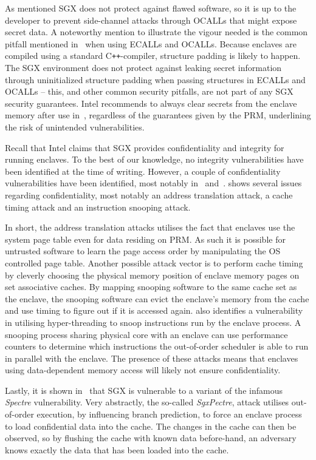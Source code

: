 \documentclass{article}
\newcommand\cpp{C\texttt{++}\xspace}
\begin{document}
    As mentioned SGX does not protect against flawed software, so it is up to the developer to prevent side-channel attacks through OCALLs that might expose secret data.
	A noteworthy mention to illustrate the vigour needed is the common pitfall mentioned in~\cite{intel_sgx_guide} when using ECALLs and OCALLs.
	Because enclaves are compiled using a standard \cpp-compiler, structure padding is likely to happen.
	The SGX environment does not protect against leaking secret information through uninitialized structure padding when passing structures in ECALLs and OCALLs -- this, and other common security pitfalls, are not part of any SGX security guarantees.
	Intel recommends to always clear secrets from the enclave memory after use in~\cite{intel_sgx_guide}, regardless of the guarantees given by the PRM, underlining the risk of unintended vulnerabilities.

    Recall that Intel claims that SGX provides confidentiality and integrity for running enclaves.
    To the best of our knowledge, no integrity vulnerabilities have been identified at the time of writing.
    However, a couple of confidentiality vulnerabilities have been identified, most notably in~\cite{costan_intel_2016} and~\cite{chen_sgxpectre_2018}.
	\cite{costan_intel_2016} shows several issues regarding confidentiality, most notably an address translation attack, a cache timing attack and an instruction snooping attack.

    In short, the address translation attacks utilises the fact that enclaves use the system page table even for data residing on PRM.
    As such it is possible for untrusted software to learn the page access order by manipulating the OS controlled page table.
	Another possible attack vector is to perform cache timing by cleverly choosing the physical memory position of enclave memory pages on set associative caches.
	By mapping snooping software to the same cache set as the enclave, the snooping software can evict the enclave's memory from the cache and use timing to figure out if it is accessed again.
    \cite{costan_intel_2016} also identifies a vulnerability in utilising hyper-threading to snoop instructions run by the enclave process. A snooping process sharing physical core with an enclave can use performance counters to determine which instructions the out-of-order scheduler is able to run in parallel with the enclave.
	The presence of these attacks means that enclaves using data-dependent memory access will likely not ensure confidentiality.

	Lastly, it is shown in~\cite{chen_sgxpectre_2018} that SGX is vulnerable to a variant of the infamous \textit{Spectre} vulnerability.
	Very abstractly, the so-called \textit{SgxPectre}, attack utilises out-of-order execution, by influencing branch prediction, to force an enclave process to load confidential data into the cache.
	The changes in the cache can then be observed, so by flushing the cache with known data before-hand, an adversary knows exactly the data that has been loaded into the cache.
\end{document}
